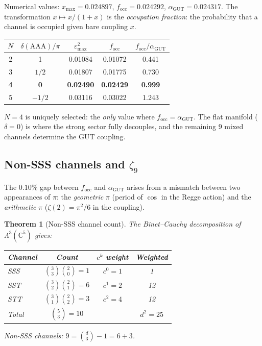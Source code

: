 \documentclass[12pt]{article}
\newtheorem{theorem}{Theorem}[section]
\theoremstyle{remark}
\theoremstyle{definition}
\newcommand{\CC}{\mathbb{C}}
\begin{document}
Numerical values: $x_{\max} = 0.024897$, $f_{\mathrm{occ}} = 0.024292$, $\alpha_\text{GUT} = 0.024317$.  The transformation $x \mapsto x/(1+x)$ is the \emph{occupation fraction}: the probability that a channel is occupied given bare coupling $x$.

\begin{center}
\begin{tabular}{ccccc}
\hline
$N$ & $\delta(\mathrm{AAA})/\pi$ & $\varepsilon_{\max}^2$ & $f_{\mathrm{occ}}$ & $f_{\mathrm{occ}}/\alpha_\text{GUT}$ \\
\hline
2 & 1 & 0.01084 & 0.01072 & 0.441 \\
3 & $1/2$ & 0.01807 & 0.01775 & 0.730 \\
\textbf{4} & \textbf{0} & \textbf{0.02490} & \textbf{0.02429} & \textbf{0.999} \\
5 & $-1/2$ & 0.03116 & 0.03022 & 1.243 \\
\hline
\end{tabular}
\end{center}

$N=4$ is uniquely selected: the \emph{only} value where $f_\mathrm{occ} = \alpha_\text{GUT}$.  The flat manifold ($\delta = 0$) is where the strong sector fully decouples, and the remaining 9 mixed channels determine the GUT coupling.

\subsection{Non-SSS channels and $\zeta_9$}
\label{sec:zeta9}

The $0.10\%$ gap between $f_\mathrm{occ}$ and $\alpha_\text{GUT}$ arises from a mismatch between two appearances of $\pi$: the \emph{geometric} $\pi$ (period of $\cos$ in the Regge action) and the \emph{arithmetic} $\pi$ ($\zeta(2) = \pi^2/6$ in the coupling).

\begin{theorem}[Non-SSS channel count]
\label{thm:channel_count}
The Binet--Cauchy decomposition of $\Lambda^3(\CC^5)$ gives:
\begin{center}
\begin{tabular}{lccc}
\hline
Channel & Count & $c^k$ weight & Weighted \\
\hline
SSS & $\binom{3}{3}\binom{2}{0} = 1$ & $c^0 = 1$ & 1 \\
SST & $\binom{3}{2}\binom{2}{1} = 6$ & $c^1 = 2$ & 12 \\
STT & $\binom{3}{1}\binom{2}{2} = 3$ & $c^2 = 4$ & 12 \\
\hline
Total & $\binom{5}{3} = 10$ & & $d^2 = 25$ \\
\hline
\end{tabular}
\end{center}
Non-SSS channels: $9 = \binom{d}{3} - 1 = 6 + 3$.
\end{theorem}
\end{document}
